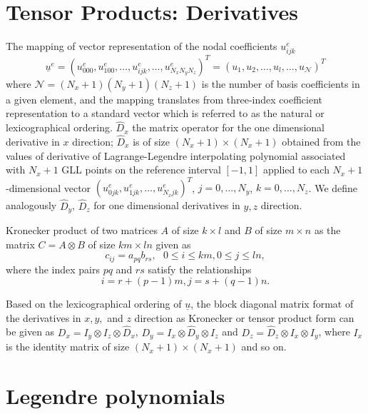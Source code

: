 \section{Tensor Products: Derivatives}\label{tens}
The mapping of vector representation of the nodal coefficients $u_{ijk}^{e}$
\begin{equation}
\underline{u}^{e} = (u_{000}^e, u_{100}^e, \ldots , u_{ijk}^e, \ldots, u_{N_xN_yN_z}^e)^T=(u_1, u_2,\ldots, u_l, \ldots, u_{\mathcal{N}})^T 
\end{equation}
where $\mathcal{N} = (N_x+1)(N_y+1)(N_z+1)$ is the number of basis coefficients in a given element, and the mapping translates from three-index coefficient representation to a standard vector which is referred to as the natural or lexicographical ordering.
$\hat{D}_x$ the matrix operator for the one dimensional derivative in $x$ direction; $\hat{D}_x$ is of size $(N_x+1)\times (N_x+1)$ obtained from the values of derivative of Lagrange-Legendre interpolating polynomial associated with $N_x + 1$ GLL points on the reference interval $[-1, 1]$ applied to each $N_x+1$-dimensional vector $(u_{0jk}^e,u_{1jk}^e, \ldots, u_{N_xjk}^e)^T$, $j = 0, \ldots, N_y$, $k = 0, \ldots, N_z$. We define analogously $\hat{D}_y$, $\hat{D}_z$ for one dimensional derivatives in $y,z$ direction.

Kronecker product of two matrices $A$ of size $k\times l$ and $B$ of size $m\times n$ as the matrix $C = A\otimes B$ of size $km\times ln$ given as 
\begin{equation}
c_{ij} = a_{pq}b_{rs},  \ \ \  0\le i\le km,  0\le j\le ln,
\end{equation}
where the index pairs $pq$ and $rs$ satisfy the relationships
\begin{equation}
i = r + (p-1)m ,      j = s + (q-1)n.
\end{equation}

 Based on the lexicographical ordering of $\underline{u}$, the block diagonal matrix format of the derivatives in $x,y,$ and $z$ direction as Kronecker or tensor product form can be given as $D_x = I_y\otimes I_z\otimes \hat{D}_x$, $D_y = I_x\otimes \hat{D}_y\otimes I_z$ and $D_z = \hat{D}_z\otimes I_x\otimes I_y$, where $I_x$ is the identity matrix of size $(N_x+1)\times (N_x+1)$ and so on.


\section{Legendre polynomials}\label{legpol}

